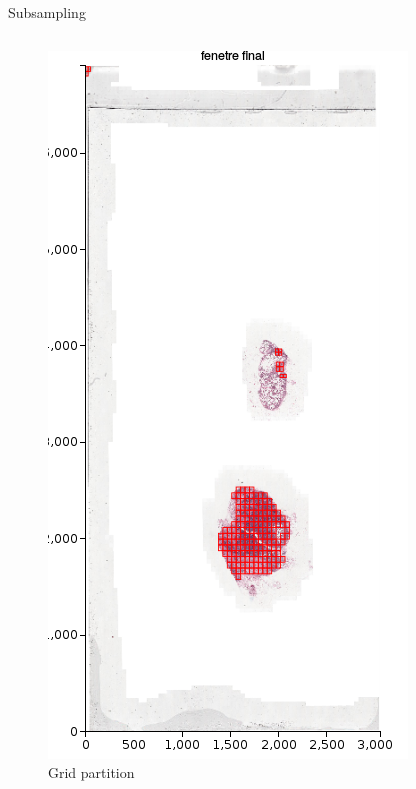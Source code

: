 \documentclass{beamer}
\begin{document}
\begin{frame}{Subsampling}
\begin{columns}[T]
\begin{column}{.25\textwidth}
\begin{figure}[!ht]
\centering
\includegraphics[width=\textwidth]{Grid.png}
\caption{Grid partition}
\label{}
\end{figure}
\end{column}%
\end{columns}
\end{frame}
\end{document}
